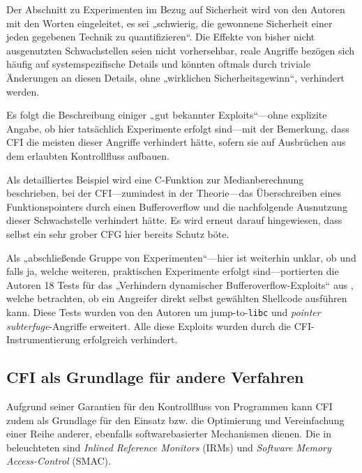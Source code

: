 \documentclass[11pt]{article}
\begin{document}
Der Abschnitt zu Experimenten im Bezug auf Sicherheit wird von den Autoren mit
den Worten eingeleitet, es sei „schwierig, die gewonnene Sicherheit einer jeden
gegebenen Technik zu quantifizieren“. Die Effekte von bisher nicht ausgenutzten
Schwachstellen seien nicht vorhersehbar, reale Angriffe bezögen sich häufig auf
systemspezifische Details und könnten oftmals durch triviale Änderungen an
diesen Details, ohne „wirklichen Sicherheitsgewinn“, verhindert werden.

Es folgt die Beschreibung einiger „gut bekannter Exploits“—ohne explizite
Angabe, ob hier tatsächlich Experimente erfolgt sind—mit der Bemerkung, dass
CFI die meisten dieser Angriffe verhindert hätte, sofern sie auf Ausbrüchen aus
dem erlaubten Kontrollfluss aufbauen.

Als detailliertes Beispiel wird eine C-Funktion zur Medianberechnung
beschrieben, bei der CFI—zumindest in der Theorie—das Überschreiben eines
Funktionspointers durch einen Bufferoverflow und die nachfolgende Ausnutzung
dieser Schwachstelle verhindert hätte. Es wird erneut darauf hingewiesen, dass
selbst ein sehr grober CFG hier bereits Schutz böte.

Als „abschließende Gruppe von Experimenten“—hier ist weiterhin unklar, ob und
falls ja, welche weiteren, praktischen Experimente erfolgt sind—portierten die
Autoren 18 Tests für das „Verhindern dynamischer Bufferoverflow-Exploits“ aus
\cite{wilander2003comparison}, welche betrachten, ob ein Angreifer direkt
selbst gewählten Shellcode ausführen kann. Diese Tests wurden von den Autoren
um jump-to-\texttt{libc} und \emph{pointer subterfuge}-Angriffe erweitert. Alle
diese Exploits wurden durch die CFI-Instrumentierung erfolgreich verhindert.



\subsection{CFI als Grundlage für andere Verfahren}

Aufgrund seiner Garantien für den Kontrollfluss von Programmen kann CFI zudem
als Grundlage für den Einsatz bzw. die Optimierung und Vereinfachung einer
Reihe anderer, ebenfalls softwarebasierter Mechanismen dienen. Die in
\cite{abadi-2009-control-tissec} beleuchteten sind \emph{Inlined Reference
Monitors} (IRMs) und \emph{Software Memory Access-Control} (SMAC).
\end{document}
